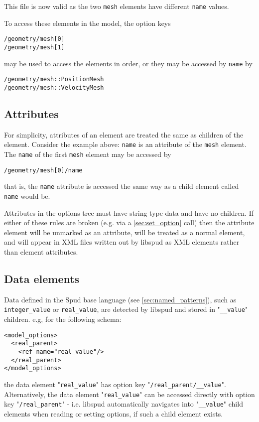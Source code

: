 \documentclass[a4paper, 11pt]{book}
\begin{document}
This file is now valid as the two \verb+mesh+ elements have different
\verb+name+ values.

To access these elements in the model, the option keys
\begin{verbatim}
/geometry/mesh[0]
/geometry/mesh[1]
\end{verbatim}
may be used to access the elements in order, or they may be accessed
by \verb+name+ by
\begin{verbatim}
/geometry/mesh::PositionMesh
/geometry/mesh::VelocityMesh
\end{verbatim}

\subsection{Attributes}

For simplicity, attributes of an element are treated the same as children
of the element. Consider the example above: \verb+name+ is an attribute
of the \verb+mesh+ element. The \verb+name+ of the first \verb+mesh+ element
may be accessed by
\begin{verbatim}
/geometry/mesh[0]/name
\end{verbatim}
that is, the \verb+name+ attribute is accessed the same way as a child element
called \verb+name+ would be.

Attributes in the options tree must have string type data and have no children.
If either of these rules are broken (e.g. via a \ref{sec:set_option} call)
then the attribute element will be unmarked as an attribute, will be treated as
a normal element, and will appear in XML files written out by libspud as XML
elements rather than element attributes.

\subsection{Data elements}

Data defined in the Spud base language (see \ref{sec:named_patterns}), such as
\verb+integer_value+ or \verb+real_value+, are detected by libspud and stored in
"\verb+__value+" children. e.g, for the following schema:

\begin{verbatim}
<model_options>
  <real_parent>
    <ref name="real_value"/>
  </real_parent>
</model_options>
\end{verbatim}

the data element "\verb+real_value+" has option key
"\verb+/real_parent/__value+". Alternatively, the data element
"\verb+real_value+" can be accessed directly with option key
"\verb+/real_parent+" - i.e. libspud automatically navigates into
"\verb+__value+" child elements when reading or setting options, if such a child
element exists.
\end{document}
